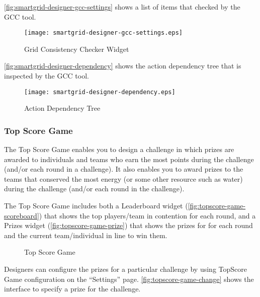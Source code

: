 \autoref{fig:smartgrid-designer-gcc-settings} shows a list of items that checked by the GCC tool. 

\begin{figure}[ht!]
  \center
  \texttt{[image: smartgrid-designer-gcc-settings.eps]}
  \caption{Grid Consistency Checker Widget}
  \label{fig:smartgrid-designer-gcc-settings}
\end{figure}

\autoref{fig:smartgrid-designer-dependency} shows the action dependency tree that is inspected by the GCC tool. 

 \begin{figure}[ht!]
  \center
  \texttt{[image: smartgrid-designer-dependency.eps]}
  \caption{Action Dependency Tree}
  \label{fig:smartgrid-designer-dependency}
\end{figure}

\clearpage

\subsubsection{Top Score Game}

The Top Score Game enables you to design a challenge in which prizes are awarded to individuals and teams who earn the most points during the challenge (and/or each round in a challenge). It also enables you to award prizes to the teams that conserved the most energy (or some other resource such as water) during the challenge (and/or each round in the challenge).

The Top Score Game includes both a Leaderboard widget (\autoref{fig:topscore-game-scoreboard}) that shows the top players/team in contention for each round, and a Prizes widget (\autoref{fig:topscore-game-prize}) that shows the prizes for for each round and the current team/individual in line to win them.

\begin{figure}[ht!]
	\centering
		\caption{Top Score Game}
		\label{fig:topscore-game}
\end{figure}

\clearpage

Designers can configure the prizes for a particular challenge by using TopScore Game configuration on the ``Settings'' page. \autoref{fig:topscore-game-change} shows the interface to specify a prize for the challenge.

